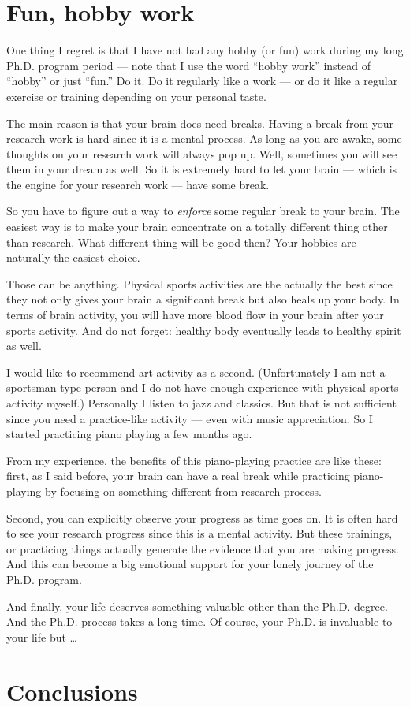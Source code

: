 \documentclass[11pt]{article}
\begin{document}
\section{Fun, hobby work}

One thing I regret is that I have not had any hobby (or fun) work
during my long Ph.D. program period --- note that I use the word
``hobby work'' instead of ``hobby'' or just ``fun.'' Do it. Do it
regularly like a work --- or do it like a regular exercise or
training depending on your personal taste.

The main reason is that your brain does need breaks. Having a
break from your research work is hard since it is a mental
process. As long as you are awake, some thoughts on your research
work will always pop up. Well, sometimes you will see them in your
dream as well. So it is extremely hard to let your brain --- which
is the engine for your research work --- have some break.

So you have to figure out a way to \emph{enforce} some regular
break to your brain. The easiest way is to make your brain
concentrate on a totally different thing other than research.
What different thing will be good then?  Your hobbies are
naturally the easiest choice. 

Those can be anything. Physical sports activities are the actually
the best since they not only gives your brain a significant break
but also heals up your body. In terms of brain activity, you will
have more blood flow in your brain after your sports activity. And
do not forget: healthy body eventually leads to healthy spirit as
well. 

I would like to recommend art activity as a second. (Unfortunately
I am not a sportsman type person and I do not have enough experience
with physical sports activity myself.) Personally I listen to jazz
and classics. But that is not sufficient since you need a
practice-like activity --- even with music appreciation. So I
started practicing piano playing a few months ago. 

From my experience, the benefits of this piano-playing practice
are like these: first, as I said before, your brain can have a
real break while practicing piano-playing by focusing on something
different from research process.

Second, you can explicitly observe your progress as time goes
on. It is often hard to see your research progress since this is a
mental activity. But these trainings, or practicing things actually
generate the evidence that you are making progress. And this can become
a big emotional support for your lonely journey of the Ph.D.
program.

And finally, your life deserves something valuable other than the Ph.D.
degree. And the Ph.D. process takes a long time. Of course, your Ph.D.
is invaluable to your life but \ldots


\section{Conclusions}
\end{document}
